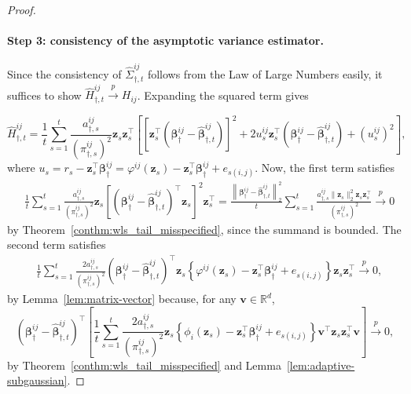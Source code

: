 \documentclass[12pt]{article}
\begin{document}
\begin{proof}
\paragraph{Step 3: consistency of the asymptotic variance estimator.} 
Since the consistency of $\widehat{\Sigma}_{\dagger,t}^{ij}$ follows from the Law of Large Numbers easily, it suffices to show $\widehat H_{\dagger,t}^{ij}\stackrel{p}{\to} H_{ij}$.
Expanding the squared term gives 

\begin{equation}
\label{equ:H_estimator_expansion} 
\widehat H_{\dagger,t}^{ij} = \frac{1}{t} \sum_{s=1}^t \frac{ a_{\dagger,s}^{ij} }{ (\pi_{\dagger,s}^{ij})^2 } \bm z_s\bm z_s^\top \left[\left[ \bm z_s^\top \left( \bm\beta_\dagger^{ij} - \widehat{\bm\beta}_{\dagger,t}^{ij} \right) \right]^2 +2u_s^{ij} \bm z_s^\top \left( \bm\beta_\dagger^{ij} - \widehat{\bm\beta}_{\dagger,t}^{ij} \right) + (u_s^{ij}) ^2\right],
\end{equation} 
where $u_s=r_s - \bm z_s^\top \bm\beta_\dagger^{ij} = \varphi^{ij}(\bm z_s) - \bm z_s^\top \bm\beta_\dagger^{ij} + e_{s(i,j)}$.
Now, the first term satisfies
\begin{align*}
&
\frac{1}{t}
\sum_{s=1}^t
\frac{a_{\dagger,s}^{ij}}{(\pi_{\dagger,s}^{ij})^2}
\bm z_s
\left[
\left(
\bm\beta_\dagger^{ij}
-
\widehat{\bm\beta}_{\dagger,t}^{ij}
\right)^\top
\bm z_s
\right]^2
\bm z_s^\top
=
\frac{
\left\|
\bm\beta_\dagger^{ij}
-
\widehat{\bm\beta}_{\dagger,t}^{ij}
\right\|_2^2}{t}
\sum_{s=1}^t
\frac{a_{\dagger,s}^{ij}\|\bm z_s\|_2^2\bm z_s\bm z_s^\top}{(\pi_{\dagger,s}^{ij})^2}
\stackrel{p}{\to} 0
\end{align*}
by Theorem~\ref{conthm:wls_tail_misspecified}, since the summand is bounded. The second term satisfies
\begin{align*}
&
\frac{1}{t}
\sum_{s=1}^t
\frac{2a_{\dagger,s}^{ij}}{(\pi_{\dagger,s}^{ij})^2}
\left(
\bm\beta_\dagger^{ij}
-
\widehat{\bm\beta}_{\dagger,t}^{ij}
\right)^\top
\bm z_s
\left\{
\varphi^{ij}(\bm z_s) 
-
\bm z_s^\top\bm\beta_\dagger^{ij}+e_{s(i,j)}
\right\}
\bm z_s\bm z_s^\top
\stackrel{p}{\to}
0,
\end{align*}
by Lemma~\ref{lem:matrix-vector} because, for any $\bm v\in\mathbb R^d$,
\[
\left(
\bm\beta_\dagger^{ij}
-
\widehat{\bm\beta}_{\dagger,t}^{ij}
\right)^\top
\left[
\frac{1}{t}
\sum_{s=1}^t
\frac{2a_{\dagger,s}^{ij}}{(\pi_{\dagger,s}^{ij})^2}
\bm z_s
\left\{
\phi_i(\bm z_s)
-
\bm z_s^\top\bm\beta_\dagger^{ij}
+e_{s(i,j)}
\right\}
\bm v^\top
\bm z_s\bm z_s^\top
\bm v
\right]
\stackrel{p}{\to} 0,
\]
by Theorem~\ref{conthm:wls_tail_misspecified} and Lemma~\ref{lem:adaptive-subgaussian}.

\end{proof}
\end{document}
